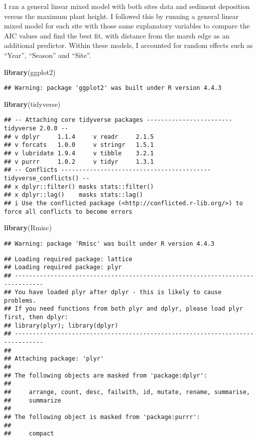\documentclass[
]{article}
\newenvironment{Shaded}{\begin{snugshade}}{\end{snugshade}}
\newcommand{\FunctionTok}[1]{\textcolor[rgb]{0.13,0.29,0.53}{\textbf{#1}}}
\newcommand{\NormalTok}[1]{#1}
\begin{document}
I ran a general linear mixed model with both sites data and sediment
deposition versus the maximum plant height. I followed this by running a
general linear mixed model for each site with those same explanatory
variables to compare the AIC values and find the best fit, with distance
from the marsh edge as an additional predictor. Within these models, I
accounted for random effects such as ``Year'', ``Season'' and ``Site''.

\begin{Shaded}
\begin{Highlighting}[]
\FunctionTok{library}\NormalTok{(ggplot2)}
\end{Highlighting}
\end{Shaded}

\begin{verbatim}
## Warning: package 'ggplot2' was built under R version 4.4.3
\end{verbatim}

\begin{Shaded}
\begin{Highlighting}[]
\FunctionTok{library}\NormalTok{(tidyverse)}
\end{Highlighting}
\end{Shaded}

\begin{verbatim}
## -- Attaching core tidyverse packages ------------------------ tidyverse 2.0.0 --
## v dplyr     1.1.4     v readr     2.1.5
## v forcats   1.0.0     v stringr   1.5.1
## v lubridate 1.9.4     v tibble    3.2.1
## v purrr     1.0.2     v tidyr     1.3.1
## -- Conflicts ------------------------------------------ tidyverse_conflicts() --
## x dplyr::filter() masks stats::filter()
## x dplyr::lag()    masks stats::lag()
## i Use the conflicted package (<http://conflicted.r-lib.org/>) to force all conflicts to become errors
\end{verbatim}

\begin{Shaded}
\begin{Highlighting}[]
\FunctionTok{library}\NormalTok{(Rmisc)}
\end{Highlighting}
\end{Shaded}

\begin{verbatim}
## Warning: package 'Rmisc' was built under R version 4.4.3
\end{verbatim}

\begin{verbatim}
## Loading required package: lattice
## Loading required package: plyr
## ------------------------------------------------------------------------------
## You have loaded plyr after dplyr - this is likely to cause problems.
## If you need functions from both plyr and dplyr, please load plyr first, then dplyr:
## library(plyr); library(dplyr)
## ------------------------------------------------------------------------------
## 
## Attaching package: 'plyr'
## 
## The following objects are masked from 'package:dplyr':
## 
##     arrange, count, desc, failwith, id, mutate, rename, summarise,
##     summarize
## 
## The following object is masked from 'package:purrr':
## 
##     compact
\end{verbatim}
\end{document}
